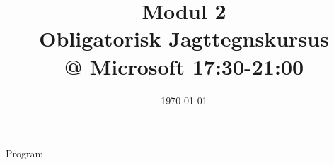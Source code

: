 \documentclass[11pt,aspectratio=169]{beamer}
\title[Modul 2]{Modul 2 \\
Obligatorisk Jagttegnskursus \\ @ Microsoft 17:30-21:00}
\date{\today}
\begin{document}
\begin{frame}
  \titlepage
\end{frame}

\begin{frame}{Program}
  \tableofcontents
\end{frame}



















\end{document}
